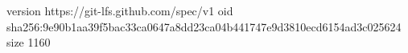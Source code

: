 version https://git-lfs.github.com/spec/v1
oid sha256:9e90b1aa39f5bac33ca0647a8dd23ca04b441747e9d3810ecd6154ad3c025624
size 1160
